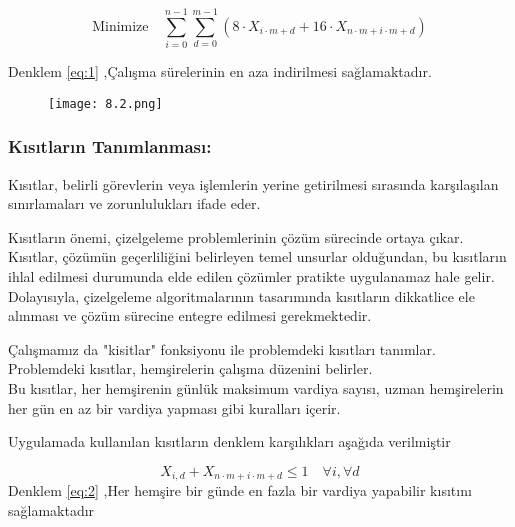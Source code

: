 \documentclass[12pt, a4paper]{article}
\begin{document}
\begin{flushleft}
\begin{equation}
	\label{eq:1}
	\text{Minimize} \quad \sum_{i=0}^{n-1} \sum_{d=0}^{m-1} \left( 8 \cdot X_{i \cdot m + d} + 16 \cdot X_{n \cdot m + i \cdot m + d} \right)
\end{equation}

Denklem \ref{eq:1} ,Çalışma sürelerinin en aza indirilmesi sağlamaktadır.

\begin{figure}[!h]
	\centering
	\texttt{[image: 8.2.png]}
	
\end{figure}

\subsubsection{Kısıtların Tanımlanması:}
\item Kısıtlar, belirli görevlerin veya işlemlerin yerine getirilmesi sırasında karşılaşılan sınırlamaları ve zorunlulukları ifade eder.
\newpage
\item Kısıtların önemi, çizelgeleme problemlerinin çözüm sürecinde ortaya çıkar. Kısıtlar, çözümün geçerliliğini belirleyen temel unsurlar olduğundan, bu kısıtların ihlal edilmesi durumunda elde edilen çözümler pratikte uygulanamaz hale gelir. Dolayısıyla, çizelgeleme algoritmalarının tasarımında kısıtların dikkatlice ele alınması ve çözüm sürecine entegre edilmesi gerekmektedir.

\item Çalışmamız da "kisitlar" fonksiyonu  ile problemdeki kısıtları tanımlar.
Problemdeki kısıtlar, hemşirelerin çalışma düzenini belirler.\\ 
Bu kısıtlar, her hemşirenin günlük maksimum vardiya sayısı, uzman hemşirelerin her gün en az bir vardiya yapması gibi kuralları içerir.\\[10pt]

\item Uygulamada kullanılan  kısıtların  denklem karşılıkları aşağıda verilmiştir



\begin{equation}
	\label{eq:2}
	X_{i,d} + X_{n \cdot m + i \cdot m + d} \leq 1 \quad \forall i, \forall d
\end{equation}
Denklem \ref{eq:2} ,Her hemşire bir günde en fazla bir vardiya yapabilir kısıtını sağlamaktadır 


\end{flushleft}
\end{document}
